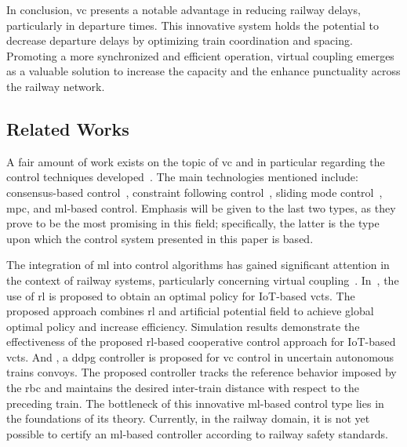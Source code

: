 In conclusion, \gls{vc} presents a notable advantage in reducing railway delays, particularly in departure times. This innovative system holds the potential to decrease departure delays by optimizing train coordination and spacing. Promoting a more synchronized and efficient operation, virtual coupling emerges as a valuable solution to increase the capacity and the enhance punctuality across the railway network.
%
\subsection{Related Works}
\label{subsec:relatedWorks}

A fair amount of work exists on the topic of \gls{vc} and in particular regarding the control techniques developed~\cite{wu2023railway}. The main technologies mentioned include: consensus-based control~\cite{wu2023dynamics}, constraint following control~\cite{zhang2023optimal,wang2022constraint}, sliding mode control~\cite{park2022,liu2023method}, \gls{mpc}, and \gls{ml}-based control. Emphasis will be given to the last two types, as they prove to be the most promising in this field; specifically, the latter is the type upon which the control system presented in this paper is based.

The integration of \gls{ml} into control algorithms has gained significant attention in the context of railway systems, particularly concerning virtual coupling~\cite{basile2022roadmap}. In~\cite{wang2021}, the use of \gls{rl} is proposed to obtain an optimal policy for IoT-based \gls{vcts}. The proposed approach combines \gls{rl} and artificial potential field to achieve global optimal policy and increase efficiency. Simulation results demonstrate the effectiveness of the proposed \gls{rl}-based cooperative control approach for IoT-based \gls{vcts}. And \cite{basile2022}, a \gls{ddpg} controller is proposed for \gls{vc} control in uncertain autonomous trains convoys. The proposed controller tracks the reference behavior imposed by the \gls{rbc} and maintains the desired inter-train distance with respect to the preceding train. 
%
The bottleneck of this innovative \gls{ml}-based control type lies in the foundations of its theory. Currently, in the railway domain, it is not yet possible to certify an \gls{ml}-based controller according to railway safety standards.

